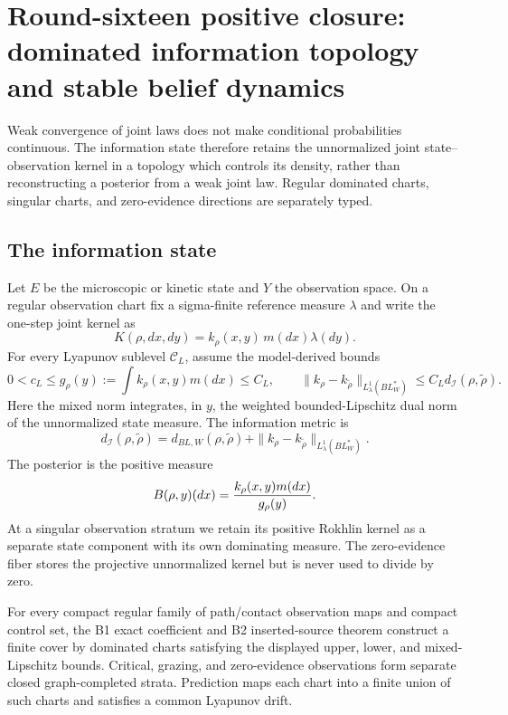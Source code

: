 \section{Round-sixteen positive closure: dominated information topology and stable belief dynamics}
\label{sec:r16-c1}

Weak convergence of joint laws does not make conditional probabilities
continuous.  The information state therefore retains the unnormalized joint
state--observation kernel in a topology which controls its density, rather than
reconstructing a posterior from a weak joint law.  Regular dominated charts,
singular charts, and zero-evidence directions are separately typed.

\subsection{The information state}

Let \(E\) be the microscopic or kinetic state and \(Y\) the observation space.
On a regular observation chart fix a sigma-finite reference measure \(\lambda\)
and write the one-step joint kernel as
\[
 K(\rho,dx,dy)=k_\rho(x,y)\,m(dx)\lambda(dy).
\]
For every Lyapunov sublevel \(\mathcal C_L\), assume the model-derived bounds
\[
 0<c_L\le g_\rho(y):=\int k_\rho(x,y)m(dx)\le C_L,
 \qquad
 \|k_\rho-k_{\tilde\rho}\|_{L^1_\lambda(BL_W^*)}
 \le C_Ld_{\mathcal I}(\rho,\tilde\rho).
\]
Here the mixed norm integrates, in \(y\), the weighted bounded-Lipschitz dual
norm of the unnormalized state measure.  The information metric is
\[
 d_{\mathcal I}(\rho,\tilde\rho)
 =d_{BL,W}(\rho,\tilde\rho)
 +\|k_\rho-k_{\tilde\rho}\|_{L^1_\lambda(BL_W^*)}.
\]
The posterior is the positive measure
\[
 B(\rho,y)(dx)={k_\rho(x,y)m(dx)\over g_\rho(y)}.
\]
At a singular observation stratum we retain its positive Rokhlin kernel as a
separate state component with its own dominating measure.  The zero-evidence
fiber stores the projective unnormalized kernel but is never used to divide by
zero.

\begin{theorem}
\label{thm:r16-c1-chart}
For every compact regular family of path/contact observation maps and compact
control set, the B1 exact coefficient and B2 inserted-source theorem construct
a finite cover by dominated charts satisfying the displayed upper, lower, and
mixed-Lipschitz bounds.  Critical, grazing, and zero-evidence observations form
separate closed graph-completed strata.  Prediction maps each chart into a
finite union of such charts and satisfies a common Lyapunov drift.
\end{theorem}

